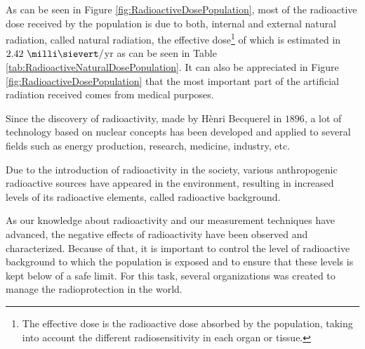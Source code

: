 As can be seen in Figure \ref{fig:RadioactiveDosePopulation}, most of the radioactive dose received by the population is due to both, internal and external natural radiation, called natural radiation, the effective dose\footnote{The effective dose is the radioactive dose absorbed by the population, taking into account the different radiosensitivity in each organ or tissue.} of which is estimated in $2.42~\milli\sievert/$yr as can be seen in Table \ref{tab:RadioactiveNaturalDosePopulation}. It can also be appreciated in Figure \ref{fig:RadioactiveDosePopulation} that the most important part of the artificial radiation received comes from medical purposes. 

Since the discovery of radioactivity, made by Hènri Becquerel in $1896$, a lot of technology based on nuclear concepts has been developed and applied to several fields such as energy production, research, medicine, industry, etc. 

Due to the introduction of radioactivity in the society, various anthropogenic radioactive sources have appeared in the environment, resulting in increased levels of its radioactive elements, called radioactive background. 

As our knowledge about radioactivity and our measurement techniques have advanced, the negative effects of radioactivity have been observed and characterized. Because of that, it is important to control the level of radioactive background to which the population is exposed and to ensure that these levels is kept below of a safe limit. For this task, several organizations was created to manage the radioprotection in the world.

